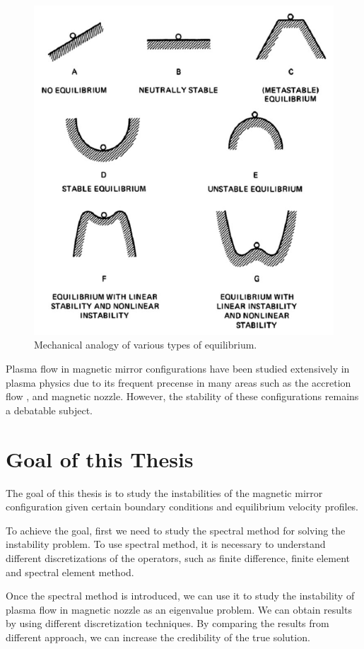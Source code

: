 \begin{figure}[htbp]
	\centering
	\includegraphics[width=0.7\linewidth]{../../thesis/img/introduction/stability-visualization}
	\caption{Mechanical analogy of various types of equilibrium. \cite{chen_introduction_2016}}
	\label{fig:stability-visualization}
\end{figure}

Plasma flow in magnetic mirror configurations have been studied extensively in plasma physics due to its frequent precense in many areas such as the accretion flow \cite{jockers_stability_1968,aikawa_stability_1979}, and magnetic nozzle\cite{smolyakov_quasineutral_2021}. However, the stability of these configurations remains a debatable subject.

\section{Goal of this Thesis}
The goal of this thesis is to study the instabilities of the magnetic mirror configuration given certain boundary conditions and equilibrium velocity profiles.

To achieve the goal, first we need to study the spectral method for solving the instability problem. To use spectral method, it is necessary to understand different discretizations of the operators, such as finite difference, finite element and spectral element method.

Once the spectral method is introduced, we can use it to study the instability of plasma flow in magnetic nozzle as an eigenvalue problem. We can obtain results by using different discretization techniques. By comparing the results from different approach, we can increase the credibility of the true solution.

